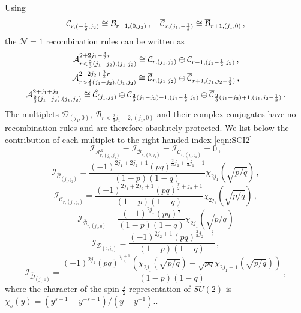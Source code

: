\documentclass[main.tex]{subfiles}
\begin{document}
Using
\begin{equation}
\mathcal{C}_{r,(-\frac{1}{2},j_2)}\cong\mathcal{B}_{r-1,(0,j_2)}\,,\quad\overline{\mathcal{C}}_{r,(j_1,-\frac{1}{2})}\cong\overline{\mathcal{B}}_{r+1,(j_1,0)}\,,
\end{equation}
the $\mathcal{N}=1$ recombination rules can be written as
\begin{gather}
\label{eqn:recomb1}\mathcal{A}^{2+2j_1-\frac{3}{2}r}_{r<\frac{2}{3}(j_1-j_2),(j_1,j_2)}\cong\mathcal{C}_{r,(j_1,j_2)}\oplus\mathcal{C}_{r-1,(j_1-\frac{1}{2},j_2)}\,,\\
\mathcal{A}^{2+2j_2+\frac{3}{2}r}_{r>\frac{2}{3}(j_1-j_2),(j_1,j_2)}\cong\overline{\mathcal{C}}_{r,(j_1,j_2)}\oplus\overline{\mathcal{C}}_{r+1,(j_1,j_2-\frac{1}{2})}\,,\\
\mathcal{A}^{2+j_1+j_2}_{\frac{2}{3}(j_1-j_2),(j_1,j_2)}\cong\hat{\mathcal{C}}_{(j_1,j_2)}\oplus\mathcal{C}_{\frac{2}{3}(j_1-j_2)-1,(j_1-\frac{1}{2},j_2)}\oplus\overline{\mathcal{C}}_{\frac{2}{3}(j_1-j_2)+1,(j_1,j_2-\frac{1}{2})}\,.\label{eqn:recomb2}
\end{gather} 
The multiplets $\overline{\mathcal{D}}_{(j_1,0)}$, $\overline{\mathcal{B}}_{r<\frac{2}{3}j_1+2,(j_1,0)}$ and their complex conjugates have no recombination rules and are therefore absolutely protected.
We list below the contribution of each multiplet to the right-handed index \eqref{eqn:SCI2}
\begin{equation}
 \mathcal{I}_{\mathcal{A}^E_{r,(j_1,j_2)}}= \mathcal{I}_{\mathcal{B}_{r,(0,j_2)}}= \mathcal{I}_{\mathcal{C}_{r,(j_1,j_2)}}=0\,,\label{eqn:multiind1}
\end{equation}
\begin{equation}
\mathcal{I}_{\hat{\mathcal{C}}_{(j_1,j_2)}}=\frac{(-1)^{2j_1+2j_2+1}(pq)^{\frac{2}{3}j_2+\frac{1}{3}j_1+1}}{(1-p)(1-q)}\chi_{2j_1}(\sqrt{p/q})\,,
\end{equation}
\begin{equation} 
 \mathcal{I}_{\overline{\mathcal{C}}_{r,(j_1,j_2)}}=\frac{(-1)^{2j_1+2j_2+1}(pq)^{\frac{r}{2}+j_2+1}}{(1-p)(1-q)}\chi_{2j_1}(\sqrt{p/q})\,,
 \end{equation}
\begin{equation}
 \mathcal{I}_{\overline{\mathcal{B}}_{r,(j_1,0)}}=\frac{(-1)^{2j_1}(pq)^{\frac{r}{2}}}{(1-p)(1-q)}\chi_{2j_1}(\sqrt{p/q})
 \end{equation}
\begin{equation}
\mathcal{I}_{\mathcal{D}_{(0,j_2)}}=\frac{(-1)^{2j_2+1}(pq)^{\frac{2}{3}j_2+\frac{2}{3}}}{(1-p)(1-q)}\,,
\end{equation}
\begin{equation}
  \mathcal{I}_{\overline{\mathcal{D}}_{(j_1,0)}}=\frac{(-1)^{2j_1}(pq)^{\frac{j_1+1}{3}}\left(\chi_{2j_1}(\sqrt{p/q})-\sqrt{pq}\chi_{2j_1-1}(\sqrt{p/q})\right)}{(1-p)(1-q)}\,,\label{eqn:multiind2}
\end{equation}
where the character of the spin-$\frac{s}{2}$ representation of $SU(2)$ is \newline$\chi_{s}(y)=(y^{s+1}-y^{-s-1})/(y-y^{-1})$..
\end{document}
